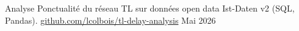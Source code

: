 

\begin{cvhonors}

  \cvhonor
    {Analyse} %
    {Ponctualité du réseau TL sur données open data Ist-Daten v2 (SQL, Pandas). \url{github.com/lcolbois/tl-delay-analysis}} %
    {} %
    {Mai 2026} %
\end{cvhonors}

